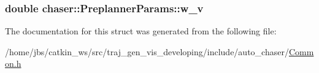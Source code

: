 \subsubsection[{\texorpdfstring{w\+\_\+v}{w_v}}]{\setlength{\rightskip}{0pt plus 5cm}double chaser\+::\+Preplanner\+Params\+::w\+\_\+v}\hypertarget{structchaser_1_1_preplanner_params_a1778793e5b16806c867291c1a5471a04}{}\label{structchaser_1_1_preplanner_params_a1778793e5b16806c867291c1a5471a04}


The documentation for this struct was generated from the following file\+:\begin{DoxyCompactItemize}
\item 
/home/jbs/catkin\+\_\+ws/src/traj\+\_\+gen\+\_\+vis\+\_\+developing/include/auto\+\_\+chaser/\hyperlink{_common_8h}{Common.\+h}\end{DoxyCompactItemize}
